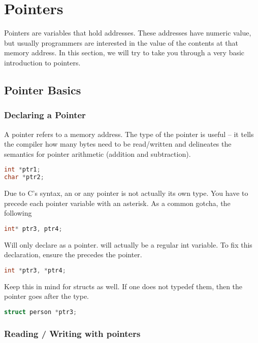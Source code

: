 \section{Pointers}

Pointers are variables that hold addresses.
These addresses have numeric value, but usually programmers are interested in the value of the contents at that memory address.
In this section, we will try to take you through a very basic introduction to pointers.

\subsection{Pointer Basics}

\subsubsection{Declaring a Pointer}

A pointer refers to a memory address. The type of the pointer is useful -- it tells the compiler how many bytes need to be read/written and delineates the semantics for pointer arithmetic (addition and subtraction).

\begin{lstlisting}[language=C]
int *ptr1;
char *ptr2;
\end{lstlisting}

Due to C's syntax, an  or any pointer is not actually its own type.
You have to precede each pointer variable with an asterisk.
As a common gotcha, the following

\begin{lstlisting}[language=C]
int* ptr3, ptr4;
\end{lstlisting}

Will only declare  as a pointer.
 will actually be a regular int variable.
To fix this declaration, ensure the \keyword{*} precedes the pointer.

\begin{lstlisting}[language=C]
int *ptr3, *ptr4;
\end{lstlisting}

Keep this in mind for structs as well.
If one does not typedef them, then the pointer goes after the type.

\begin{lstlisting}[language=C]
struct person *ptr3;
\end{lstlisting}

\subsubsection{Reading / Writing with pointers}

